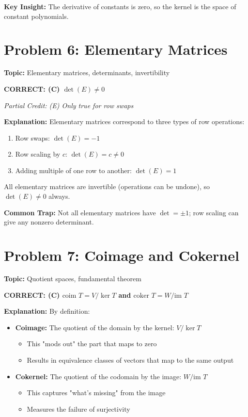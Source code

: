 \documentclass[12pt]{amsart}
\newcommand{\correct}[1]{{\color{blue}\textbf{CORRECT: #1}}}
\newcommand{\partcred}[1]{{\color{red}\textit{Partial Credit: #1}}}
\newcommand{\hint}{\textbf{Key Insight: }}
\newcommand{\trap}{\textbf{Common Trap: }}
\begin{document}
\hint The derivative of constants is zero, so the kernel is the space of constant polynomials.

\hrulefill

\section*{Problem 6: Elementary Matrices}
\textbf{Topic:} Elementary matrices, determinants, invertibility

\correct{(C) $\det(E) \neq 0$}

\partcred{(E) Only true for row swaps}

\textbf{Explanation:} Elementary matrices correspond to three types of row operations:
\begin{enumerate}
\item Row swaps: $\det(E) = -1$
\item Row scaling by $c$: $\det(E) = c \neq 0$
\item Adding multiple of one row to another: $\det(E) = 1$
\end{enumerate}

All elementary matrices are invertible (operations can be undone), so $\det(E) \neq 0$ always.

\trap Not all elementary matrices have $\det = \pm 1$; row scaling can give any nonzero determinant.

\hrulefill

\section*{Problem 7: Coimage and Cokernel}
\textbf{Topic:} Quotient spaces, fundamental theorem

\correct{(C) $\text{coim } T = V/\ker T$ and $\text{coker } T = W/\text{im } T$}

\textbf{Explanation:} By definition:
\begin{itemize}
\item \textbf{Coimage:} The quotient of the domain by the kernel: $V/\ker T$
  \begin{itemize}
  \item This "mods out" the part that maps to zero
  \item Results in equivalence classes of vectors that map to the same output
  \end{itemize}
\item \textbf{Cokernel:} The quotient of the codomain by the image: $W/\text{im } T$
  \begin{itemize}
  \item This captures "what's missing" from the image
  \item Measures the failure of surjectivity
  \end{itemize}
\end{itemize}
\end{document}
